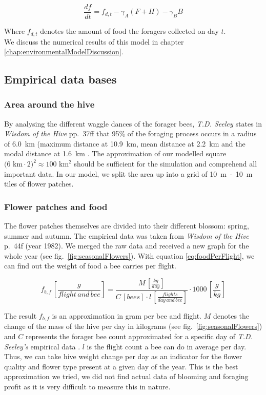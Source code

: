 			\begin{equation}\label{eq:changeFoodStoreDyn}
				\frac{df}{dt} = f_{d,t} - \gamma_A (F+H) - \gamma_B B
			\end{equation}
			
			Where $f_{d,t}$ denotes the amount of food the foragers collected on day $t$.\\
			
			We discuss the numerical results of this model in chapter \ref{chap:environmentalModelDiscussion}.
		
	\subsection{Empirical data bases}
		\subsubsection{Area around the hive}
			By analysing the different waggle dances of the forager bees, \textit{T.D. Seeley} states in \textit{Wisdom of the Hive} pp.~37ff that 95\% of the foraging process occurs in a radius of 6.0~km (maximum distance at 10.9~km, mean distance at 2.2~km and the modal distance at 1.6~km \cite{seeley95}. The approximation of our modelled square $\text{(6~km}\cdot\text{2)}^2 \approx \text{100~km}^2$ should be sufficient for the simulation and comprehend all important data. In our model, we split the area up into a grid of 10~m~$\cdot$~10~m tiles of flower patches.
			
		\subsubsection{Flower patches and food}
			\label{chap:flowerPatchesAndFood}
			The flower patches themselves are divided into their different blossom: spring, summer and autumn. The empirical data was taken from \textit{Wisdom of the Hive} p.~44f (year 1982). We merged the raw data and received a new graph for the whole year (see fig.~\ref{fig:seasonalFlowers}). With equation \ref{eq:foodPerFlight}, we can find out the weight of food a bee carries per flight. 
			
			\begin{equation}\label{eq:foodPerFlight}
						f_{b,f} \,[\frac{g}{flight\, and\, bee}] = \frac{M \,[\frac{kg}{day}]}{C \,[bees] \cdot l \,[\frac{flights}{day \,and\, bee}]}\cdot 1000 \,[\frac{g}{kg}]
			\end{equation}
			
			The result $f_{b,f}$ is an approximation in gram per bee and flight. $M$ denotes the change of the mass of the hive per day in kilograms (see fig.~\ref{fig:seasonalFlowers}) and $C$ represents the forager bee count approximated for a specific day of \textit{T.D. Seeley's} empirical data \cite{seeley95}. $l$ is the flight count a bee can do in average per day. Thus, we can take hive weight change per day as an indicator for the flower quality and flower type present at a given day of the year. This is the best approximation we tried, we did not find actual data of blooming and foraging profit as it is very difficult to measure this in nature.
			
